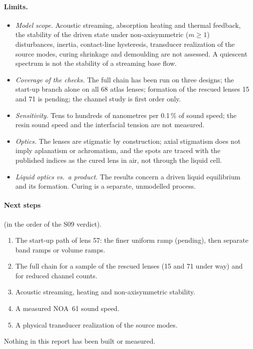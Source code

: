 \documentclass[11pt,a4paper]{article}
\numberwithin{equation}{section}
\begin{document}
\paragraph{Limits.}
\begin{itemize}
\item \emph{Model scope.} Acoustic streaming, absorption heating and thermal
feedback, the stability of the driven state under non-axisymmetric ($m\ge1$) disturbances, inertia,
contact-line hysteresis, transducer realization of the source modes, curing
shrinkage and demoulding are not assessed. A quiescent spectrum is not the
stability of a streaming base flow.
\item \emph{Coverage of the checks.} The full chain has been run on three designs;
the start-up branch alone on all 68 atlas lenses; formation of the rescued lenses
15 and 71 is pending; the channel study is first order only.
\item \emph{Sensitivity.} Tens to hundreds of nanometres per 0.1\,\% of sound
speed; the resin sound speed and the interfacial tension are not measured.
\item \emph{Optics.} The lenses are stigmatic by construction; axial stigmatism
does not imply aplanatism or achromatism, and the spots are traced with the
published indices as the cured lens in air, not through the liquid cell.
\item \emph{Liquid optics vs.\ a product.} The results concern a driven liquid
equilibrium and its formation. Curing is a separate, unmodelled process.
\end{itemize}

\paragraph{Next steps} (in the order of the S09 verdict).
\begin{enumerate}
\item The start-up path of lens 57: the finer uniform ramp (pending), then
separate band ramps or volume ramps.
\item The full chain for a sample of the rescued lenses (15 and 71 under way) and
for reduced channel counts.
\item Acoustic streaming, heating and non-axisymmetric stability.
\item A measured NOA~61 sound speed.
\item A physical transducer realization of the source modes.
\end{enumerate}
Nothing in this report has been built or measured.
\end{document}
